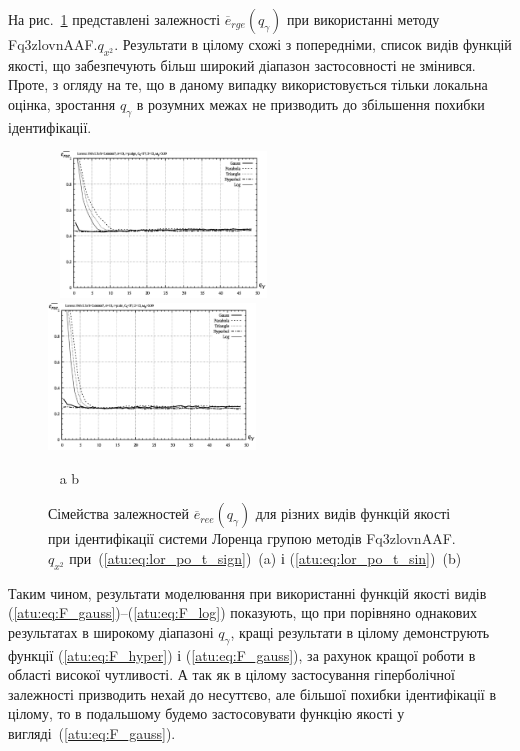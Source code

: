 На рис.~\ref{atu:f:lor_ftype_ree} представлені залежності
$ \overline{e}_{rge} (q_\gamma) $ при використанні методу Fq3zlovnAAF.$q_{x^2} $.
Результати в цілому схожі з попередніми, список
видів функцій якості, що забезпечують більш широкий діапазон
застосовності не змінився. Проте, з огляду на те, що в даному
випадку використовується тільки локальна оцінка, зростання
$ q_\gamma $ в розумних межах не призводить до збільшення похибки
ідентифікації.

\begin{figure}[ht!]
  \begin{center}
    ~ \hfill
    \includegraphics[width=0.49\textwidth]{p/cha/lor/Fq3zlovnAAF/f_type/lor_Fq3zlovnAAF_qx2_Ft-p_qg_e_all_sign_ree.png}
    \hfill
    \includegraphics[width=0.49\textwidth]{p/cha/lor/Fq3zlovnAAF/f_type/lor_Fq3zlovnAAF_qx2_Ft-p_qg_e_all_sin_ree.png}
    \hfill ~
  \end{center}
  \vspace{-1.0ex}
  \begin{center}
    ~ \hfill a \hfill\hfill b \hfill ~
  \end{center}
  \vspace{-1.5ex}
  \caption{Сімейства залежностей $ \overline{e}_{ree} (q_\gamma) $ для різних видів функцій якості при ідентифікації системи Лоренца групою методів Fq3zlovnAAF.$q_{x^2} $ при~(\ref{atu:eq:lor_po_t_sign})~(a) і (\ref{atu:eq:lor_po_t_sin})~(b)}
  \label{atu:f:lor_ftype_ree}
\end{figure}

Таким чином, результати моделювання при використанні функцій
якості видів (\ref{atu:eq:F_gauss})--(\ref{atu:eq:F_log}) показують, що при
порівняно однакових результатах в широкому діапазоні
$ q_\gamma $, кращі результати в цілому демонструють функції
(\ref{atu:eq:F_hyper}) і (\ref{atu:eq:F_gauss}), за рахунок кращої роботи в області
високої чутливості. А так як в цілому застосування гіперболічної
залежності призводить нехай до несуттєво, але більшої похибки
ідентифікації в цілому, то в подальшому будемо застосовувати
функцію якості у вигляді~(\ref{atu:eq:F_gauss}).

